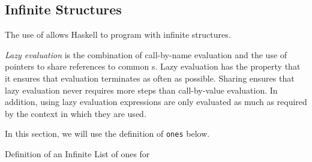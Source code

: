 \subsection{Infinite Structures}\label{subsec:Infinite_Structures}
The use of  allows Haskell to program with infinite structures.

\begin{definition}\label{def:Lazy_Evaluation}
  \emph{Lazy evaluation} is the combination of call-by-name evaluation and the use of pointers to share references to common s.
  Lazy evaluation has the property that it ensures that evaluation terminates as often as possible.
  Sharing ensures that lazy evaluation never requires more steps than call-by-value evaluation.
  In addition, using lazy evaluation expressions are only evaluated as much as required by the context in which they are used.
\end{definition}

In this section, we will use the definition of \texttt{ones} below.
\begin{listing}[h!tbp]
\caption{Definition of an Infinite List of ones for }
\label{lst:Ones_Definition}
\end{listing}


